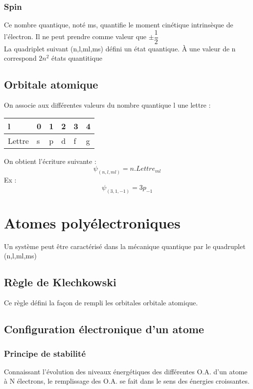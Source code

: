 \subsection{Spin}
Ce nombre quantique, noté ms, quantifie le moment cinétique intrinsèque de l'électron. Il ne peut prendre comme valeur que $\pm \dfrac{1}{2}$\\
La quadriplet suivant (n,l,ml,ms) défini un état quantique. À une valeur de n correspond $2n^2$ états quantitique
\section{Orbitale atomique}
On associe aux différentes valeurs du nombre quantique l une lettre :
\begin{center}
\begin{tabular}{|l|l|l|l|l|l|}
\hline
l & 0 & 1 & 2 & 3 & 4 \\ \hline
Lettre & s & p & d & f & g \\ \hline
\end{tabular}
\end{center}
On obtient l'écriture suivante :
$$\psi_{(n,l,ml)}=n.Lettre_{ml}$$
Ex :
$$\psi_{(3,1,-1)}=3p_{-1}$$
\chapter{Atomes polyélectroniques}
Un système peut être caractérisé dans la mécanique quantique par le quadruplet (n,l,ml,ms)
\section{Règle de Klechkowski}
Ce règle défini la façon de rempli les orbitales orbitale atomique. 
\section{Configuration électronique d'un atome}
\subsection{Principe de stabilité}
\begin{enon}
 Connaissant l'évolution des niveaux énergétiques des différentes O.A. d'un atome à N électrons, le remplissage des O.A. se fait dans le sens des énergies croissantes.
\end{enon}
